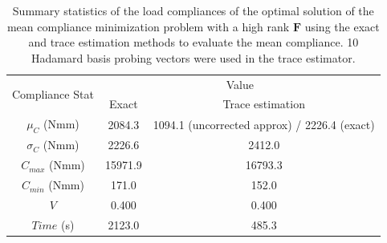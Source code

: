     \begin{table}
     \centering
     \caption{Summary statistics of the load compliances of the optimal solution of the mean compliance minimization problem with a high rank $\bm{F}$ using the exact and trace estimation methods to evaluate the mean compliance. 10 Hadamard basis probing vectors were used in the trace estimator.}
     \begin{tabular}{|c|c|c|}
      \hline
      \multirow{2}{5em}{Compliance Stat} & \multicolumn{2}{c|}{Value} \\\cline{2-3}
      & Exact & Trace estimation \\
      \hline
      \hline
      $\mu_C$ (Nmm) & 2084.3 & 1094.1 (uncorrected approx) / 2226.4 (exact) \\
      \hline
      $\sigma_C$ (Nmm) & 2226.6 & 2412.0 \\
      \hline
      $C_{max}$ (Nmm) & 15971.9 & 16793.3 \\
      \hline
      $C_{min}$ (Nmm) & 171.0 & 152.0 \\
      \hline
      $V$ & 0.400 & 0.400 \\
      \hline
      $Time$ (s) & 2123.0 & 485.3 \\
      \hline
     \end{tabular}
     \label{tab:mean_stats_high_rank}
    \end{table}

